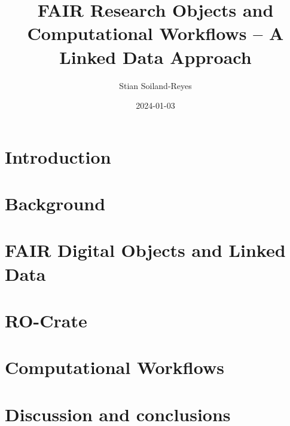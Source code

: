 \documentclass[british,a4paper]{book}
\title{FAIR Research Objects and Computational Workflows – A Linked Data Approach}
\author{Stian Soiland-Reyes}
\date{2024-01-03}
\begin{document}
\frontmatter
\maketitle



\tableofcontents
{}

\listoffigures
{}

\listoftables
{}

\listoflistings
{}


\mainmatter
\fancyhead[LO]{\leftmark}


\chapter{Introduction}
\label{chapter:introduction}


\chapter{Background}
\label{chapter:background}


\chapter{FAIR Digital Objects and Linked Data}
\label{chapter:fdo}




\chapter{RO-Crate}
\label{chapter:ro-crate}





\chapter{Computational Workflows}
\label{chapter:workflows}







\chapter{Discussion and conclusions}
\label{chapter:conclusions}


\end{document}
